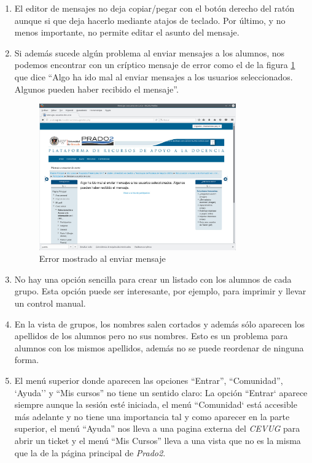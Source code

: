 \begin{enumerate}
\item El editor de mensajes no deja copiar/pegar con el botón derecho del ratón aunque si que deja hacerlo mediante atajos de teclado. Por último, y no menos importante, no permite editar el asunto del mensaje.

\item Si además sucede algún problema al enviar mensajes a los alumnos, nos podemos encontrar con un críptico mensaje de error como el de la figura \ref{fig:pantallazoPradoMensaje2} que dice  ``Algo ha ido mal al enviar mensajes a los usuarios seleccionados. Algunos pueden haber recibido el mensaje''.


\begin{figure}[h!]
\centering
\includegraphics[width=0.8\textwidth]{../screenshots/pantallazoPradoMensaje2}
\caption{Error mostrado al enviar mensaje}
\label{fig:pantallazoPradoMensaje2}
\end{figure}


\item No hay una opción sencilla para crear un listado con los alumnos de cada grupo. Esta  opción puede ser interesante, por ejemplo, para imprimir y llevar un control manual.

\item En la vista de grupos, los nombres salen cortados y además sólo aparecen los apellidos de los alumnos pero no sus nombres. Esto es un problema para alumnos con los mismos apellidos, además no se puede reordenar de ninguna forma.

\item El menú superior donde aparecen las opciones ``Entrar'', ``Comunidad'', `Ayuda'' y ``Mis cursos'' no tiene un sentido claro: La opción ``Entrar` aparece siempre aunque la sesión esté iniciada, el menú ``Comunidad` está accesible más adelante y no tiene una importancia tal y como aparecer en la parte superior, el menú ``Ayuda'' nos lleva a una pagina externa del \textit{CEVUG} para abrir un ticket y el menú ``Mis Cursos'' lleva a una vista que no es la misma que la de la página principal de \textit{Prado2}.


\end{enumerate}
